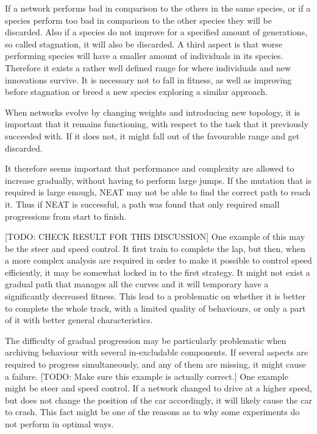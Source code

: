 If a network performs bad in comparison to the others in the same species, or if a species perform too bad in comparison to the other species they will be discarded\cite{stanley:neat}. Also if a species do not improve for a specified amount of generations, so called stagnation, it will also be discarded. A third aspect is that worse performing species will have a smaller amount of individuals in its species. Therefore it exists a rather well defined range for where individuals and new innovations survive. It is necessary not to fall in fitness, as well as improving before stagnation or breed a new species exploring a similar approach.

When networks evolve by changing weights and introducing new topology, it is important that it remains functioning, with respect to the task that it previously succeeded with. If it does not, it might fall out of the favourable range and get discarded. 


It therefore seems important that performance and complexity are allowed to increase gradually, without having to perform large jumps. If the mutation that is required is large enough, NEAT may not be able to find the correct path to reach it. Thus if NEAT is successful, a path was found that only required small progressions from start to finish.

[TODO: CHECK RESULT FOR THIS DISCUSSION] One example of this may be the steer and speed control. It first train to complete the lap, but then, when a more complex analysis are required in order to make it possible to control speed efficiently, it may be somewhat locked in to the first strategy. It might not exist a gradual path that manages all the curves and it will temporary have a significantly decreased fitness. This lead to a problematic on whether it is better to complete the whole track, with a limited quality of behaviours, or only a part of it with better general characteristics.

The difficulty of gradual progression may be particularly problematic when archiving behaviour with several in-excludable components. If several aspects are required to progress simultaneously, and any of them are missing, it might cause a failure. [TODO: Make sure this example is actually correct.] One example might be steer and speed control. If a network changed to drive at a higher speed, but does not change the position of the car accordingly, it will likely cause the car to crash. This fact might be one of the reasons as to why some experiments do not perform in optimal ways.

